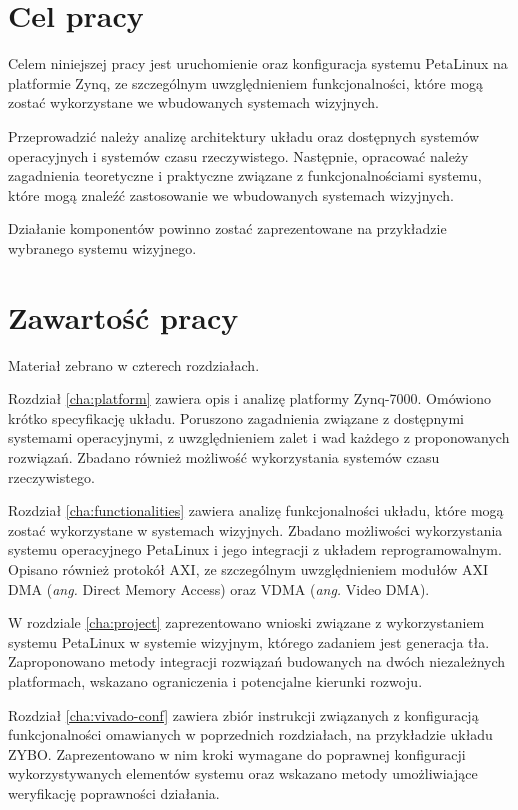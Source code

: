 \section{Cel pracy}

Celem niniejszej pracy jest uruchomienie oraz konfiguracja systemu PetaLinux na platformie Zynq, ze szczególnym uwzględnieniem funkcjonalności, które mogą zostać wykorzystane we wbudowanych systemach wizyjnych. %

Przeprowadzić należy analizę architektury układu oraz dostępnych systemów operacyjnych i systemów czasu rzeczywistego. %
Następnie, opracować należy zagadnienia teoretyczne i praktyczne związane z funkcjonalnościami systemu, które mogą znaleźć zastosowanie we wbudowanych systemach wizyjnych. %

Działanie komponentów powinno zostać zaprezentowane na przykładzie wybranego systemu wizyjnego. %

\section{Zawartość pracy}

Materiał zebrano w czterech rozdziałach. %

Rozdział \ref{cha:platform} zawiera opis i analizę platformy Zynq-7000. Omówiono krótko specyfikację układu. Poruszono zagadnienia związane z dostępnymi systemami operacyjnymi, z uwzględnieniem zalet i wad każdego z proponowanych rozwiązań. Zbadano również możliwość wykorzystania systemów czasu rzeczywistego.

Rozdział \ref{cha:functionalities} zawiera analizę funkcjonalności układu, które mogą zostać wykorzystane w systemach wizyjnych. Zbadano możliwości wykorzystania systemu operacyjnego PetaLinux i jego integracji z układem reprogramowalnym. Opisano również protokół AXI, ze szczególnym uwzględnieniem modułów AXI DMA (\emph{ang.} Direct Memory Access) oraz VDMA (\emph{ang.} Video DMA).

W rozdziale \ref{cha:project} zaprezentowano wnioski związane z wykorzystaniem systemu PetaLinux w systemie wizyjnym, którego zadaniem jest generacja tła. Zaproponowano metody integracji rozwiązań budowanych na dwóch niezależnych platformach, wskazano ograniczenia i potencjalne kierunki rozwoju. %

Rozdział \ref{cha:vivado-conf} zawiera zbiór instrukcji związanych z konfiguracją funkcjonalności omawianych w poprzednich rozdziałach, na przykładzie układu ZYBO. Zaprezentowano w nim kroki wymagane do poprawnej konfiguracji wykorzystywanych elementów systemu oraz wskazano metody umożliwiające weryfikację poprawności działania.